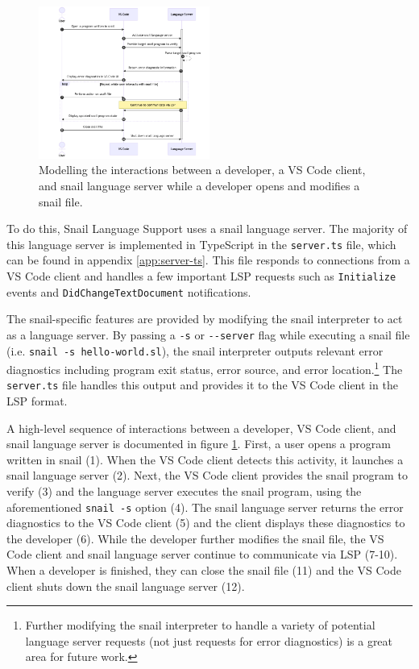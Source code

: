 \documentclass{article}
\begin{document}
\begin{figure}
    \includegraphics[width=0.5\textwidth]{lsp-sequence.png}
    \caption{
        \centering
            Modelling the interactions between a developer, a VS Code client, and snail language server while a developer opens and modifies a snail file.
    }
    \label{fig:lsp-sequence}
\end{figure}

To do this, Snail Language Support uses a snail language server. The majority of this language server is implemented in TypeScript in the \lstinline{server.ts} file, which can be found in appendix \ref{app:server-ts}. This file responds to connections from a VS Code client and handles a few important LSP requests such as \lstinline{Initialize} events and \lstinline{DidChangeTextDocument} notifications.

The snail-specific features are provided by modifying the snail interpreter to act as a language server. By passing a \lstinline{-s} or \lstinline{--server} flag while executing a snail file (i.e. \lstinline{snail -s hello-world.sl}), the snail interpreter outputs relevant error diagnostics including program exit status, error source, and error location.\footnote{Further modifying the snail interpreter to handle a variety of potential language server requests (not just requests for error diagnostics) is a great area for future work.} The \lstinline{server.ts} file handles this output and provides it to the VS Code client in the LSP format.

A high-level sequence of interactions between a developer, VS Code client, and snail language server is documented in figure \ref{fig:lsp-sequence}. First, a user opens a program written in snail (1). When the VS Code client detects this activity, it launches a snail language server (2). Next, the VS Code client provides the snail program to verify (3) and the language server executes the snail program, using the aforementioned \lstinline{snail -s} option (4). The snail language server returns the error diagnostics to the VS Code client (5) and the client displays these diagnostics to the developer (6). While the developer further modifies the snail file, the VS Code client and snail language server continue to communicate via LSP (7-10). When a developer is finished, they can close the snail file (11) and the VS Code client shuts down the snail language server (12). 
\end{document}
